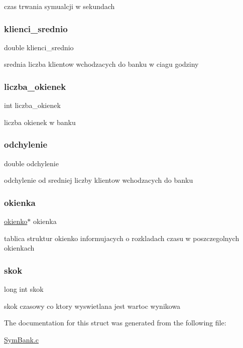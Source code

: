 czas trwania symualcji w sekundach \mbox{\label{structdane_a33bb3f25d776d0e10089695c7994ff4e}} 
\subsubsection{\texorpdfstring{klienci\+\_\+srednio}{klienci\_srednio}}
{\footnotesize\ttfamily double klienci\+\_\+srednio}

srednia liczba klientow wchodzacych do banku w ciagu godziny \mbox{\label{structdane_abf7971cf83feea5113c1c7ddbdecd5a3}} 
\subsubsection{\texorpdfstring{liczba\+\_\+okienek}{liczba\_okienek}}
{\footnotesize\ttfamily int liczba\+\_\+okienek}

liczba okienek w banku \mbox{\label{structdane_aa30144067a7b85b6fad270378f9a12b8}} 
\subsubsection{\texorpdfstring{odchylenie}{odchylenie}}
{\footnotesize\ttfamily double odchylenie}

odchylenie od sredniej liczby klientow wchodzacych do banku \mbox{\label{structdane_a6e2a3c026fc959ef68208e1651f83d81}} 
\subsubsection{\texorpdfstring{okienka}{okienka}}
{\footnotesize\ttfamily \hyperlink{structokienko}{okienko}$\ast$ okienka}

tablica struktur okienko informujacych o rozkladach czasu w poszczegolnych okienkach \mbox{\label{structdane_abf45c744fd4547efb397b53149ccac62}} 
\subsubsection{\texorpdfstring{skok}{skok}}
{\footnotesize\ttfamily long int skok}

skok czasowy co ktory wyswietlana jest wartoc wynikowa 

The documentation for this struct was generated from the following file\+:\begin{DoxyCompactItemize}
\item 
\hyperlink{_sym_bank_8c}{Sym\+Bank.\+c}\end{DoxyCompactItemize}
